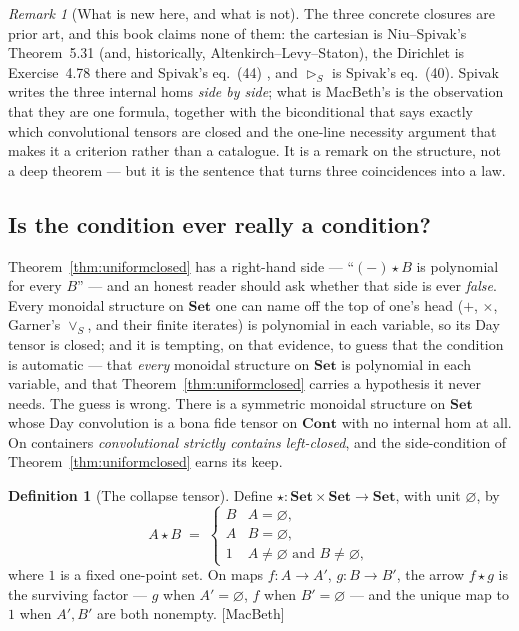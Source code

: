 \documentclass[11pt,a4paper]{book}
\newcommand{\Set}{\mathbf{Set}}
\newcommand{\Cont}{\mathbf{Cont}}
\theoremstyle{plain}
\theoremstyle{definition}
\newtheorem{Definition}[Theorem]{Definition}
\theoremstyle{remark}
\newtheorem{Remark}[Theorem]{Remark}
\newcommand{\prov}[1]{\hfill\textsf{\footnotesize[#1]}}
\begin{document}
\begin{Remark}[What is new here, and what is not]\label{rem:closednovelty}
The three concrete closures are prior art, and this book claims none of them: the
cartesian is Niu--Spivak's Theorem~5.31 \cite{NiuSpivak23} (and, historically,
Altenkirch--Levy--Staton), the Dirichlet is Exercise~4.78 there and Spivak's
eq.~(44) \cite{SpivakRef}, and $\rhd_S$ is Spivak's eq.~(40). Spivak writes the
three internal homs \emph{side by side}; what is MacBeth's is the observation that
they are one formula, together with the biconditional that says exactly which
convolutional tensors are closed and the one-line necessity argument that makes it
a criterion rather than a catalogue. It is a remark on the structure, not a deep
theorem --- but it is the sentence that turns three coincidences into a law.
\end{Remark}

\subsection{Is the condition ever really a condition?}
\label{sec:vacuity}

Theorem~\ref{thm:uniformclosed} has a right-hand side --- ``$(-)\star B$ is
polynomial for every $B$'' --- and an honest reader should ask whether that side
is ever \emph{false}. Every monoidal structure on $\Set$ one can name off the top
of one's head ($+$, $\times$, Garner's $\vee_S$, and their finite iterates) is
polynomial in each variable, so its Day tensor is closed; and it is tempting, on
that evidence, to guess that the condition is automatic --- that \emph{every}
monoidal structure on $\Set$ is polynomial in each variable, and that
Theorem~\ref{thm:uniformclosed} carries a hypothesis it never needs. The guess is
wrong. There is a symmetric monoidal structure on $\Set$ whose Day convolution is
a bona fide tensor on $\Cont$ with no internal hom at all. On containers
\emph{convolutional strictly contains left-closed}, and the side-condition of
Theorem~\ref{thm:uniformclosed} earns its keep.

\begin{Definition}[The collapse tensor]\label{def:collapse}
Define $\star\colon\Set\times\Set\to\Set$, with unit $\varnothing$, by
\[
   A\star B \;=\;
   \begin{cases}
     B & A=\varnothing,\\
     A & B=\varnothing,\\
     1 & A\neq\varnothing \text{ and } B\neq\varnothing,
   \end{cases}
\]
where $1$ is a fixed one-point set. On maps $f\colon A\to A'$, $g\colon B\to B'$,
the arrow $f\star g$ is the surviving factor --- $g$ when $A'=\varnothing$, $f$
when $B'=\varnothing$ --- and the unique map to $1$ when $A',B'$ are both
nonempty. \prov{MacBeth}
\end{Definition}
\end{document}
